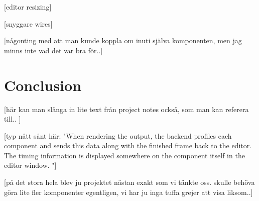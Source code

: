 [editor resizing]

[snyggare wires]

[någonting med att man kunde koppla om inuti själva komponenten, men jag minns inte vad det var bra för..]

\chapter{Conclusion}

[här kan man slänga in lite text från project notes också, som man kan referera till.. ]

[typ nått sånt här: "When rendering the output, the backend profiles each component and sends this data along with the finished frame back to the editor. The timing information is displayed somewhere on the component itself in the editor window. "]

[på det stora hela blev ju projektet nästan exakt som vi tänkte oss. skulle behöva göra lite fler komponenter egentligen, vi har ju inga tuffa grejer att visa liksom..]